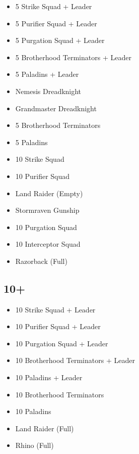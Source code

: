 \documentclass{HordeModeTarot}
\begin{document}
\begin{multicols}{2}
\begin{itemize}[leftmargin=*]
\item[] 5 Strike Squad + Leader
\item[] 5 Purifier Squad + Leader
\item[] 5 Purgation Squad + Leader
\item[] 5 Brotherhood Terminators + Leader
\item[] 5 Paladins + Leader
\item[] Nemesis Dreadknight
\item[] Grandmaster Dreadknight
\item[] 5 Brotherhood Terminators
\item[] 5 Paladins
\item[] 10 Strike Squad
\item[] 10 Purifier Squad
\item[] Land Raider (Empty)
\item[] Stormraven Gunship
\item[] 10 Purgation Squad
\item[] 10 Interceptor Squad
\item[] Razorback (Full)
\end{itemize}

\subsection*{10+}

\begin{itemize}[leftmargin=*]
\item[] 10 Strike Squad + Leader
\item[] 10 Purifier Squad + Leader
\item[] 10 Purgation Squad + Leader
\item[] 10 Brotherhood Terminators + Leader
\item[] 10 Paladins + Leader
\item[] 10 Brotherhood Terminators
\item[] 10 Paladins
\item[] Land Raider (Full)
\item[] Rhino (Full)
\end{itemize}


\end{multicols}
\end{document}
